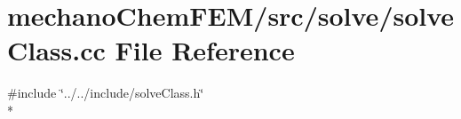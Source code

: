 \section{mechano\-Chem\-F\-E\-M/src/solve/solve\-Class.cc File Reference}
\label{solve_class_8cc}
{\ttfamily \#include \char`\"{}../../include/solve\-Class.\-h\char`\"{}}\\*
